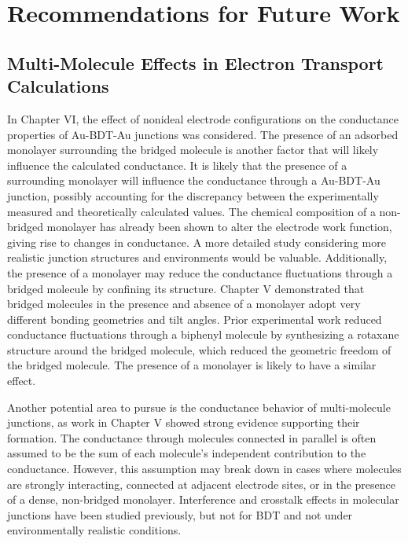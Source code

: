 \documentclass[10pt]{report}  %
\newcommand\findent{\hspace*{\parindent}}
\begin{document}
\section{Recommendations for Future Work}

\subsection{Multi-Molecule Effects in Electron Transport Calculations}

\findent In Chapter VI, the effect of nonideal electrode configurations on the conductance properties of Au-BDT-Au junctions was considered. The presence of an adsorbed monolayer surrounding the bridged molecule is another factor that will likely influence the calculated conductance. It is likely that the presence of a surrounding monolayer will influence the conductance through a Au-BDT-Au junction, possibly accounting for the discrepancy between the experimentally measured and theoretically calculated values. The chemical composition of a non-bridged monolayer has already been shown to alter the electrode work function, giving rise to changes in conductance. \cite{Fatemi:2011} A more detailed study considering more realistic junction structures and environments would be valuable. Additionally, the presence of a monolayer may reduce the conductance fluctuations through a bridged molecule by confining its structure. Chapter V demonstrated that bridged molecules in the presence and absence of a monolayer adopt very different bonding geometries and tilt angles. Prior experimental work \cite{Kiguchi:2012} reduced conductance fluctuations through a biphenyl molecule by synthesizing a rotaxane structure around the bridged molecule, which reduced the geometric freedom of the bridged molecule. The presence of a monolayer is likely to have a similar effect.   

Another potential area to pursue is the conductance behavior of multi-molecule junctions, as work in Chapter V showed strong evidence supporting their formation. The conductance through molecules connected in parallel is often assumed to be the sum of each molecule's independent contribution to the conductance.\cite{Kushmerick:2003} However, this assumption may break down in cases where molecules are strongly interacting, connected at adjacent electrode sites, or in the presence of a dense, non-bridged monolayer. Interference\cite{Vazquez:2012,Guedon:2012,Markussen:2010} and crosstalk \cite{Reuter:2011} effects in molecular junctions have been studied previously, but not for BDT and not under environmentally realistic conditions.
\end{document}
